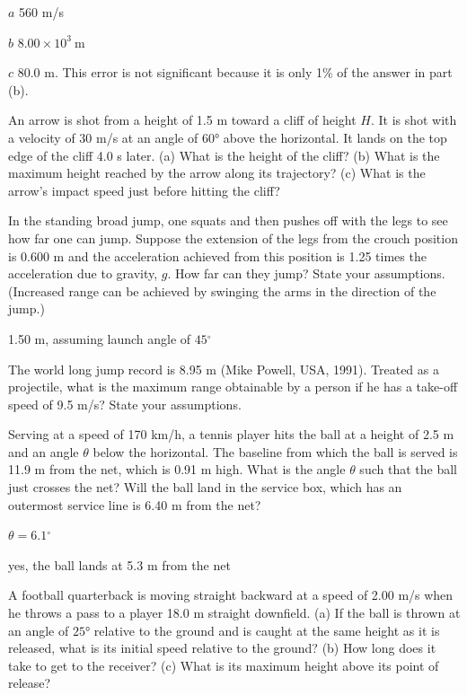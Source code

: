 \documentclass[
]{book}
\begin{document}
\leavevmode{}%
\(a\) 560 m/s

\(b\) \({8\text{.}{\text{00} \times \text{10}^{3}}\ \text{m}}{}\)

\(c\) 80.0 m. This error is not significant because it is only 1\% of the
answer in part (b).

\hypertarget{fs-id1925728}{}
\leavevmode{}%
An arrow is shot from a height of 1.5 m toward a cliff of height \(H{}\).
It is shot with a velocity of 30 m/s at an angle of \(\text{60°}{}\) above
the horizontal. It lands on the top edge of the cliff 4.0 s later. (a)
What is the height of the cliff? (b) What is the maximum height reached
by the arrow along its trajectory? (c) What is the arrow's impact speed
just before hitting the cliff?

\hypertarget{fs-id1745072}{}
\leavevmode{}%
In the standing broad jump, one squats and then pushes off with the legs
to see how far one can jump. Suppose the extension of the legs from the
crouch position is 0.600 m and the acceleration achieved from this
position is 1.25 times the acceleration due to gravity, \(g{}\). How far
can they jump? State your assumptions. (Increased range can be achieved
by swinging the arms in the direction of the jump.)

\leavevmode{}%
1.50 m, assuming launch angle of \(45{^\circ}\)

\hypertarget{fs-id1875777}{}
\leavevmode{}%
The world long jump record is 8.95 m (Mike Powell, USA, 1991). Treated
as a projectile, what is the maximum range obtainable by a person if he
has a take-off speed of 9.5 m/s? State your assumptions.

\hypertarget{fs-id2254986}{}
\leavevmode{}%
Serving at a speed of 170 km/h, a tennis player hits the ball at a
height of 2.5 m and an angle \(\theta{}\) below the horizontal. The
baseline from which the ball is served is 11.9 m from the net, which is
0.91 m high. What is the angle \(\theta{}\) such that the ball just
crosses the net? Will the ball land in the service box, which has an
outermost service line is 6.40 m from the net?

\leavevmode{}%
\({\theta = 6.1{^\circ}}{}\)

yes, the ball lands at 5.3 m from the net

\hypertarget{fs-id2173828}{}
\leavevmode{}%
A football quarterback is moving straight backward at a speed of 2.00
m/s when he throws a pass to a player 18.0 m straight downfield. (a) If
the ball is thrown at an angle of \(\text{25°}{}\) relative to the ground
and is caught at the same height as it is released, what is its initial
speed relative to the ground? (b) How long does it take to get to the
receiver? (c) What is its maximum height above its point of release?
\end{document}
